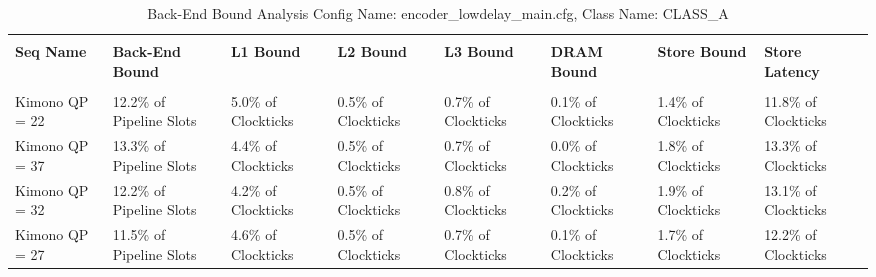 \documentclass{article}%
\begin{document}
\newpage%
\begin{longtabu}{| X[l] | X[l] | X[l] | X[l] | X[l] | X[l] | X[l] | X[l] |}%
\caption{%
Back{-}End Bound Analysis\newline%
 Config Name: encoder\_lowdelay\_main.cfg,\newline%
 Class Name: CLASS\_A\newline%
%
}%
\hline%
&&&&&&&\\%
\textbf{Seq Name}&\textbf{Back{-}End Bound}&\textbf{L1 Bound}&\textbf{L2 Bound}&\textbf{L3 Bound}&\textbf{DRAM Bound}&\textbf{Store Bound}&\textbf{Store Latency}\\%
&&&&&&&\\%
\hline%
\endhead%
Kimono\newline%
 QP = 22&12.2\% of Pipeline Slots&5.0\% of Clockticks&0.5\% of Clockticks&0.7\% of Clockticks&0.1\% of Clockticks&1.4\% of Clockticks&11.8\% of Clockticks\\%
\hline%
Kimono\newline%
 QP = 37&13.3\% of Pipeline Slots&4.4\% of Clockticks&0.5\% of Clockticks&0.7\% of Clockticks&0.0\% of Clockticks&1.8\% of Clockticks&13.3\% of Clockticks\\%
\hline%
Kimono\newline%
 QP = 32&12.2\% of Pipeline Slots&4.2\% of Clockticks&0.5\% of Clockticks&0.8\% of Clockticks&0.2\% of Clockticks&1.9\% of Clockticks&13.1\% of Clockticks\\%
\hline%
Kimono\newline%
 QP = 27&11.5\% of Pipeline Slots&4.6\% of Clockticks&0.5\% of Clockticks&0.7\% of Clockticks&0.1\% of Clockticks&1.7\% of Clockticks&12.2\% of Clockticks\\%
\hline%
\end{longtabu}%
\newpage

%
\end{document}
